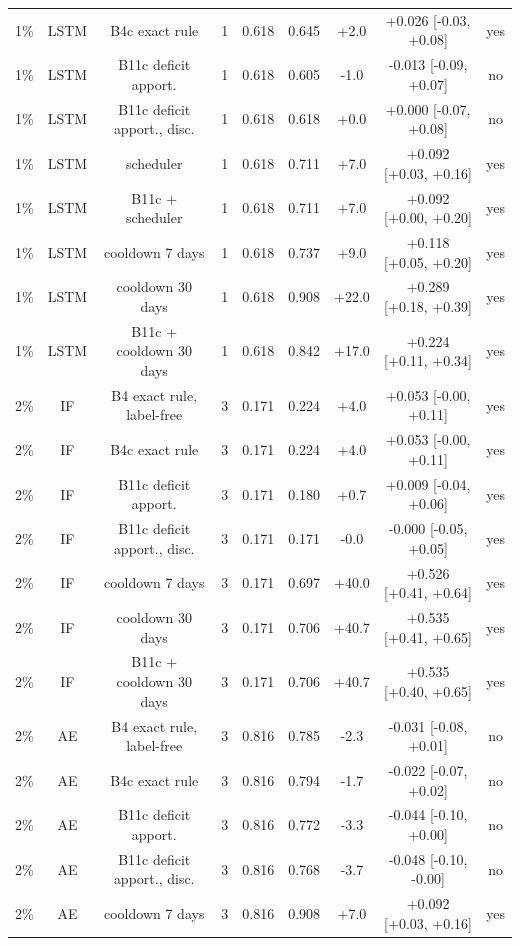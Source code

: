 \documentclass[10pt,onecolumn,letterpaper]{article}
\begin{document}
\begin{table}[!t]
{\begin{tabular}{lcccccccc}
1\% & LSTM & B4c exact rule & 1 & 0.618 & 0.645 & +2.0 & +0.026 [-0.03, +0.08] & yes \\
1\% & LSTM & B11c deficit apport. & 1 & 0.618 & 0.605 & -1.0 & -0.013 [-0.09, +0.07] & no \\
1\% & LSTM & B11c deficit apport., disc. & 1 & 0.618 & 0.618 & +0.0 & +0.000 [-0.07, +0.08] & no \\
1\% & LSTM & scheduler & 1 & 0.618 & 0.711 & +7.0 & +0.092 [+0.03, +0.16] & yes \\
1\% & LSTM & B11c + scheduler & 1 & 0.618 & 0.711 & +7.0 & +0.092 [+0.00, +0.20] & yes \\
1\% & LSTM & cooldown 7 days & 1 & 0.618 & 0.737 & +9.0 & +0.118 [+0.05, +0.20] & yes \\
1\% & LSTM & cooldown 30 days & 1 & 0.618 & 0.908 & +22.0 & +0.289 [+0.18, +0.39] & yes \\
1\% & LSTM & B11c + cooldown 30 days & 1 & 0.618 & 0.842 & +17.0 & +0.224 [+0.11, +0.34] & yes \\
2\% & IF & B4 exact rule, label-free & 3 & 0.171 & 0.224 & +4.0 & +0.053 [-0.00, +0.11] & yes \\
2\% & IF & B4c exact rule & 3 & 0.171 & 0.224 & +4.0 & +0.053 [-0.00, +0.11] & yes \\
2\% & IF & B11c deficit apport. & 3 & 0.171 & 0.180 & +0.7 & +0.009 [-0.04, +0.06] & yes \\
2\% & IF & B11c deficit apport., disc. & 3 & 0.171 & 0.171 & -0.0 & -0.000 [-0.05, +0.05] & yes \\
2\% & IF & cooldown 7 days & 3 & 0.171 & 0.697 & +40.0 & +0.526 [+0.41, +0.64] & yes \\
2\% & IF & cooldown 30 days & 3 & 0.171 & 0.706 & +40.7 & +0.535 [+0.41, +0.65] & yes \\
2\% & IF & B11c + cooldown 30 days & 3 & 0.171 & 0.706 & +40.7 & +0.535 [+0.40, +0.65] & yes \\
2\% & AE & B4 exact rule, label-free & 3 & 0.816 & 0.785 & -2.3 & -0.031 [-0.08, +0.01] & no \\
2\% & AE & B4c exact rule & 3 & 0.816 & 0.794 & -1.7 & -0.022 [-0.07, +0.02] & no \\
2\% & AE & B11c deficit apport. & 3 & 0.816 & 0.772 & -3.3 & -0.044 [-0.10, +0.00] & no \\
2\% & AE & B11c deficit apport., disc. & 3 & 0.816 & 0.768 & -3.7 & -0.048 [-0.10, -0.00] & no \\
2\% & AE & cooldown 7 days & 3 & 0.816 & 0.908 & +7.0 & +0.092 [+0.03, +0.16] & yes \\

\end{tabular}}
\end{table}
\end{document}
